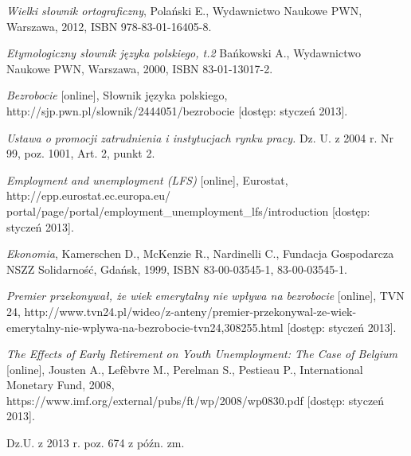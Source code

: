 \documentclass[12pt]{article}
\begin{document}
\begin{thebibliography}{9}
 \small
 
  \emph{Wielki słownik ortograficzny},
  Polański E.,
  Wydawnictwo Naukowe PWN,
  Warszawa,
  2012,
  ISBN 978-83-01-16405-8.
 
  \emph{Etymologiczny słownik języka polskiego, t.2}
  Bańkowski A.,
  Wydawnictwo Naukowe PWN,
  Warszawa,
  2000,
  ISBN 83-01-13017-2.
 
  \emph{Bezrobocie} [online],
  Słownik języka polskiego,
  http://sjp.pwn.pl/slownik/2444051/bezrobocie [dostęp: styczeń 2013].
 
  \emph{Ustawa o promocji zatrudnienia i instytucjach rynku pracy.}
  Dz. U. z 2004 r. Nr 99, poz. 1001, Art. 2, punkt 2.
 
  \emph{Employment and unemployment (LFS)} [online],
  Eurostat,
  http://epp.eurostat.ec.europa.eu/\\portal/page/portal/employment\_unemployment\_lfs/introduction [dostęp: styczeń 2013].
 
  \emph{Ekonomia},
  Kamerschen D., McKenzie R., Nardinelli C.,
  Fundacja Gospodarcza NSZZ Solidarność,
  Gdańsk,
  1999,
  ISBN 83-00-03545-1, 83-00-03545-1.
  
  \emph{Premier przekonywał, że wiek emerytalny nie wpływa na bezrobocie} [online],
  TVN 24,
  http://www.tvn24.pl/wideo/z-anteny/premier-przekonywal-ze-wiek-emerytalny-nie-wplywa-na-bezrobocie-tvn24,308255.html [dostęp: styczeń 2013].
 
  \emph{The Effects of Early Retirement on Youth Unemployment: The Case of Belgium} [online],
  Jousten A., Lefèbvre M., Perelman S., Pestieau P.,
  International Monetary Fund,
  2008,
  https://www.imf.org/external/pubs/ft/wp/2008/wp0830.pdf  [dostęp: styczeń 2013].
 
  Dz.U. z 2013 r. poz. 674 z późn. zm.
  
\end{thebibliography}
    
\end{document}
